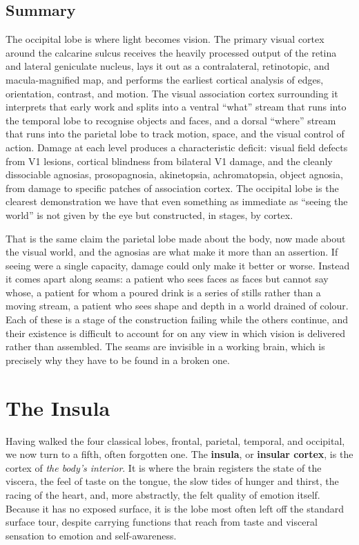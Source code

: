 \documentclass[11pt]{article}
\begin{document}
\subsection{Summary}

The occipital lobe is where light becomes vision. The primary visual cortex around the calcarine sulcus receives the heavily processed output of the retina and lateral geniculate nucleus, lays it out as a contralateral, retinotopic, and macula-magnified map, and performs the earliest cortical analysis of edges, orientation, contrast, and motion. The visual association cortex surrounding it interprets that early work and splits into a ventral ``what'' stream that runs into the temporal lobe to recognise objects and faces, and a dorsal ``where'' stream that runs into the parietal lobe to track motion, space, and the visual control of action. Damage at each level produces a characteristic deficit: visual field defects from V1 lesions, cortical blindness from bilateral V1 damage, and the cleanly dissociable agnosias, prosopagnosia, akinetopsia, achromatopsia, object agnosia, from damage to specific patches of association cortex. The occipital lobe is the clearest demonstration we have that even something as immediate as ``seeing the world'' is not given by the eye but constructed, in stages, by cortex.

That is the same claim the parietal lobe made about the body, now made about the visual world, and the agnosias are what make it more than an assertion. If seeing were a single capacity, damage could only make it better or worse. Instead it comes apart along seams: a patient who sees faces as faces but cannot say whose, a patient for whom a poured drink is a series of stills rather than a moving stream, a patient who sees shape and depth in a world drained of colour. Each of these is a stage of the construction failing while the others continue, and their existence is difficult to account for on any view in which vision is delivered rather than assembled. The seams are invisible in a working brain, which is precisely why they have to be found in a broken one.

\section{The Insula}

Having walked the four classical lobes, frontal, parietal, temporal, and occipital, we now turn to a fifth, often forgotten one. The \textbf{insula}, or \textbf{insular cortex}, is the cortex of \textit{the body's interior}. It is where the brain registers the state of the viscera, the feel of taste on the tongue, the slow tides of hunger and thirst, the racing of the heart, and, more abstractly, the felt quality of emotion itself. Because it has no exposed surface, it is the lobe most often left off the standard surface tour, despite carrying functions that reach from taste and visceral sensation to emotion and self-awareness.
\end{document}
